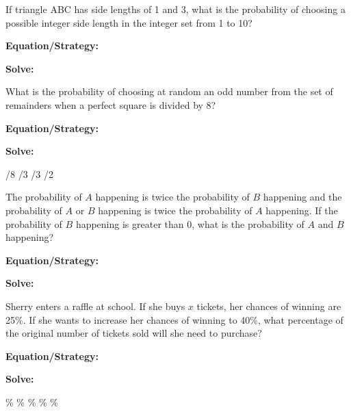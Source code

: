 \vfill
\newpage
\begin{multicols*}{2}
\begin{outline}[enumerate]
\medium

\1 If triangle ABC has side lengths of 1 and 3, what is the probability of choosing a possible integer side length in the integer set from 1 to 10?

\bigskip
\textbf{Equation/Strategy:} \hrulefill

\bigskip
\textbf{Solve:}

\vfill
{}

\midline

\1 What is the probability of choosing at random an odd number from the set of remainders when a perfect square is divided by 8?

\bigskip
\textbf{Equation/Strategy:} \hrulefill

\bigskip
\textbf{Solve:}

\vfill
{}
/8
/3
/3
/2

\columnbreak
\advanced

\1 The probability of $A$ happening is twice the probability of $B$ happening and the probability of $A$ or $B$ happening is twice the probability of $A$ happening. If the probability of $B$ happening is greater than 0, what is the probability of $A$ and $B$ happening?

\bigskip
\textbf{Equation/Strategy:} \hrulefill

\bigskip
\textbf{Solve:}

\vfill
{}

\midline

\1 Sherry enters a raffle at school. If she buys $x$ tickets, her chances of winning are 25\%. If she wants to increase her chances of winning to 40\%, what percentage of the original number of tickets sold will she need to purchase?

\bigskip
\textbf{Equation/Strategy:}

\bigskip
\textbf{Solve:}

\vfill
{}\%
\%
\%
\%
\%
\end{outline}
\end{multicols*}